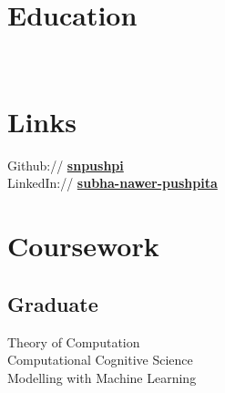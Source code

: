 \documentclass[]{deedy-resume-openfont}
\begin{document}
%
%
\lastupdated

%
%

%
%

\begin{minipage}[t]{0.33\textwidth} 


\section{Education} 

\\
\sectionsep


\section{Links} 
Github:// \href{https://github.com/snpushpi}{\bf snpushpi} \\
LinkedIn://  \href{https://www.linkedin.com/in/subha-nawer-pushpita/}{\bf subha-nawer-pushpita} \\

\section{Coursework}
\subsection{Graduate}
Theory of Computation \\
Computational Cognitive Science \\
Modelling with Machine Learning \\
\sectionsep


\end{minipage}
\end{document}

